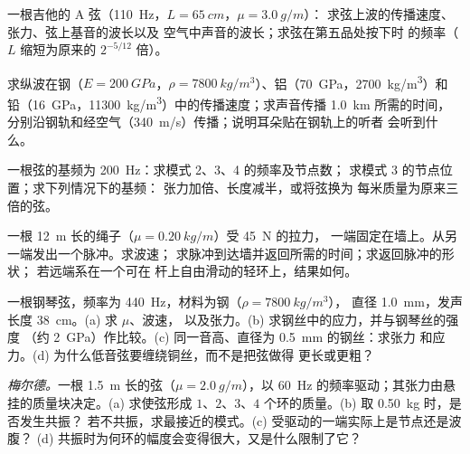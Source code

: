 \begin{exercise}[$\star$]\label{exo:b2:waves-on-strings:1}
一根吉他的 A 弦（\qty{110}{Hz}，$L = \qty{65}{cm}$，$\mu = \qty{3.0}{g/m}$）：
求弦上波的传播速度、张力、弦上基音的波长以及
空气中声音的波长；求弦在第五品处按下时
的频率（$L$ 缩短为原来的 $2^{-5/12}$ 倍）。
\end{exercise}

\begin{exercise}[$\star$]\label{exo:b2:waves-on-strings:2}
求纵波在钢（$E = \qty{200}{GPa}$，$\rho =
\qty{7800}{kg/m^3}$）、铝（\qty{70}{GPa}，\qty{2700}{kg/m^3}）和
铅（\qty{16}{GPa}，\qty{11300}{kg/m^3}）中的传播速度；求声音传播 \qty{1.0}{km} 所需的时间，
分别沿钢轨和经空气（\qty{340}{m/s}）传播；说明耳朵贴在钢轨上的听者
会听到什么。
\end{exercise}

\begin{exercise}[$\star$]\label{exo:b2:waves-on-strings:3}
一根弦的基频为 \qty{200}{Hz}：求模式 2、3、4 的频率及节点数；
求模式 3 的节点位置；求下列情况下的基频：
张力加倍、长度减半，或将弦换为
每米质量为原来三倍的弦。
\end{exercise}

\begin{exercise}[$\star$]\label{exo:b2:waves-on-strings:4}
一根 \qty{12}{m} 长的绳子（$\mu = \qty{0.20}{kg/m}$）受 \qty{45}{N} 的拉力，
一端固定在墙上。从另一端发出一个脉冲。求波速；
求脉冲到达墙并返回所需的时间；求返回脉冲的形状；
若远端系在一个可在
杆上自由滑动的轻环上，结果如何。
\end{exercise}

\begin{exercise}[$\star\star$]\label{exo:b2:waves-on-strings:5}
一根钢琴弦，频率为 \qty{440}{Hz}，材料为钢（$\rho = \qty{7800}{kg/m^3}$），
直径 \qty{1.0}{mm}，发声长度 \qty{38}{cm}。(a) 求 $\mu$、波速，
以及张力。(b) 求钢丝中的应力，并与钢琴丝的强度
（约 \qty{2}{GPa}）作比较。(c) 同一音高、直径为 \qty{0.5}{mm} 的钢丝：求张力
和应力。(d) 为什么低音弦要缠绕铜丝，而不是把弦做得
更长或更粗？
\end{exercise}

\begin{exercise}[$\star\star$]\label{exo:b2:waves-on-strings:6}
\emph{梅尔德。}一根 \qty{1.5}{m} 长的弦（$\mu = \qty{2.0}{g/m}$），以
\qty{60}{Hz} 的频率驱动；其张力由悬挂的质量块决定。(a) 求使弦形成
$1$、$2$、$3$、$4$ 个环的质量。(b) 取 \qty{0.50}{kg} 时，是否发生共振？
若不共振，求最接近的模式。(c) 受驱动的一端实际上是节点还是波腹？
(d) 共振时为何环的幅度会变得很大，又是什么限制了它？
\end{exercise}

